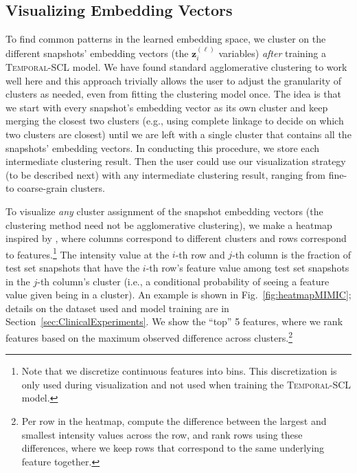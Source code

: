 \documentclass[pmlr,twocolumn,10pt]{jmlr} %
\begin{document}
\vspace{-1em}
\subsection{Visualizing Embedding Vectors}
\label{sec:visualizing}
\vspace{-.3em}

To find common patterns in the learned embedding space, we cluster on the different snapshots' embedding vectors (the $\mathbf{z}_i^{(\ell)}$ variables) \emph{after} training a \textsc{Temporal-SCL} model. We have found standard agglomerative clustering \citep{murtagh2012algorithms} to work well here and this approach trivially allows the user to adjust the granularity of clusters as needed, even from fitting the clustering model once. The idea is that we start with every snapshot's embedding vector as its own cluster and keep merging the closest two clusters (e.g., using complete linkage to decide on which two clusters are closest) until we are left with a single cluster that contains all the snapshots' embedding vectors. In conducting this procedure, we store each intermediate clustering result. Then the user could use our visualization strategy (to be described next) with any intermediate clustering result, ranging from fine- to coarse-grain clusters.

To visualize \emph{any} cluster assignment of the snapshot embedding vectors (the clustering method need not be agglomerative clustering), we make a heatmap inspired by \citet{li2020neural}, where columns correspond to different clusters and rows correspond to features.\footnote{Note that we discretize continuous features into bins. This discretization is only used during visualization and not used when training the \mbox{\textsc{Temporal-SCL}} model.} The intensity value at the $i$-th row and $j$-th column is the fraction of test set snapshots that have the $i$-th row's feature value among test set snapshots in the $j$-th column's cluster (i.e., a conditional probability of seeing a feature value given being in a cluster). An example is shown in Fig.~\ref{fig:heatmapMIMIC}; details on the dataset used and model training are in Section~\ref{sec:ClinicalExperiments}. 
We show the ``top'' 5 features,
where we rank features based on the maximum observed difference across clusters.\footnote{Per row in the heatmap, compute the difference between the largest and smallest intensity values across the row, and rank rows using these differences, where we keep rows that correspond to the same underlying feature together.}
\end{document}
